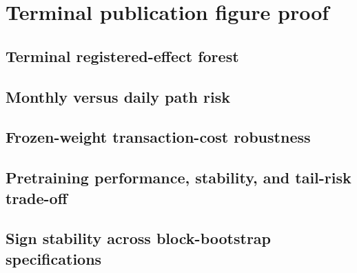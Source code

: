 \documentclass[11pt,a4paper]{article}
\begin{document}
\section*{Terminal publication figure proof}
\subsection*{Terminal registered-effect forest}
\begin{center}

\end{center}
\clearpage
\subsection*{Monthly versus daily path risk}
\begin{center}

\end{center}
\clearpage
\subsection*{Frozen-weight transaction-cost robustness}
\begin{center}

\end{center}
\clearpage
\subsection*{Pretraining performance, stability, and tail-risk trade-off}
\begin{center}

\end{center}
\clearpage
\subsection*{Sign stability across block-bootstrap specifications}
\begin{center}

\end{center}
\end{document}

